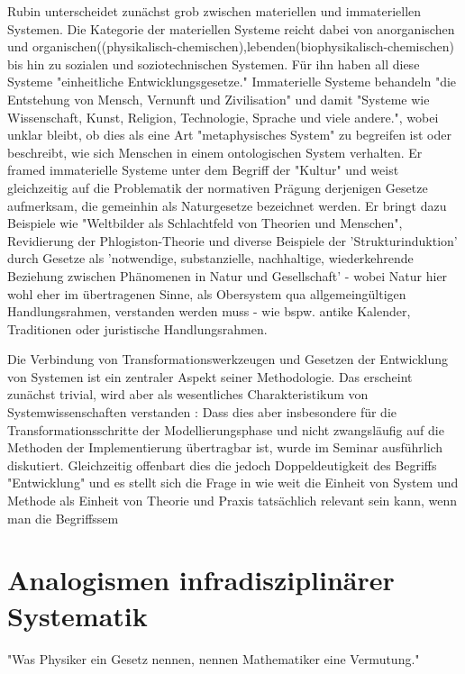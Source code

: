 \documentclass[a4paper,11pt]{article}
\begin{document}
Rubin unterscheidet zunächst grob zwischen materiellen und immateriellen Systemen. Die Kategorie der materiellen Systeme reicht dabei von
anorganischen und organischen((physikalisch-chemischen),lebenden(biophysikalisch-chemischen) bis hin zu sozialen und soziotechnischen Systemen.  
Für ihn haben all diese Systeme "einheitliche Entwicklungsgesetze."\cite{Rubin2002}
Immaterielle Systeme behandeln "die Entstehung von Mensch, Vernunft und Zivilisation"\cite{Rubin2006} und damit "Systeme wie Wissenschaft, 
Kunst, Religion, Technologie, Sprache und viele andere."\cite{Rubin2006}, wobei unklar bleibt, ob dies als eine 
Art "metaphysisches System" zu begreifen ist oder beschreibt, wie sich Menschen in einem ontologischen System verhalten. Er framed immaterielle
Systeme unter dem Begriff der "Kultur" und weist gleichzeitig auf die Problematik der normativen Prägung derjenigen Gesetze aufmerksam, die 
gemeinhin als Naturgesetze bezeichnet werden. Er bringt dazu Beispiele wie "Weltbilder als Schlachtfeld von Theorien und Menschen", Revidierung
der Phlogiston-Theorie und diverse Beispiele der 'Strukturinduktion' durch Gesetze als 'notwendige, substanzielle, nachhaltige, 
wiederkehrende Beziehung zwischen Phänomenen in Natur und Gesellschaft' - wobei Natur hier wohl eher im übertragenen Sinne,
als Obersystem qua allgemeingültigen Handlungsrahmen, verstanden werden muss - wie bspw. antike Kalender, Traditionen oder juristische Handlungsrahmen.


Die Verbindung von Transformationswerkzeugen und Gesetzen der Entwicklung von Systemen ist ein zentraler Aspekt seiner Methodologie.
Das erscheint zunächst trivial, wird aber als wesentliches Charakteristikum von Systemwissenschaften verstanden \cite{Kleemann2002}:
Dass dies aber insbesondere für die Transformationsschritte der Modellierungsphase und nicht zwangsläufig auf die Methoden der Implementierung 
übertragbar ist, wurde im Seminar\cite{LeipzigSeminar2021} ausführlich diskutiert. Gleichzeitig offenbart dies die jedoch Doppeldeutigkeit des Begriffs
"Entwicklung" und es stellt sich die Frage in wie weit die Einheit von System und Methode als Einheit von Theorie und Praxis tatsächlich
relevant sein kann, wenn man die Begriffssem


\section{Analogismen infradisziplinärer Systematik}
"Was Physiker ein Gesetz nennen, nennen Mathematiker eine Vermutung."\cite{Aaronson}
\end{document}
